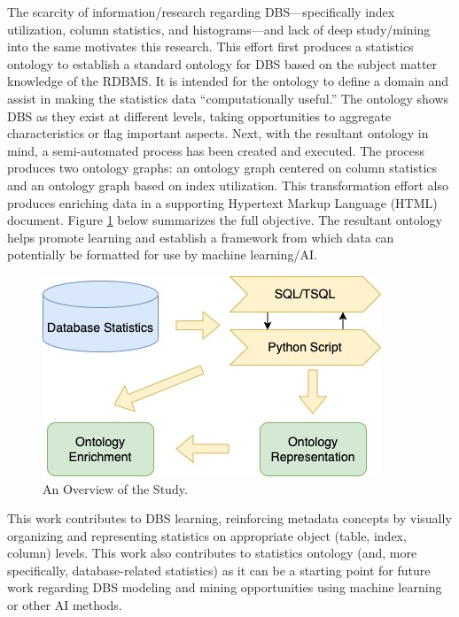 \documentclass[sigconf]{acmart}
\begin{document}
The scarcity of information/research regarding DBS—specifically index utilization, column statistics, and histograms—and lack of deep study/mining into the same motivates this research. This effort first produces a statistics ontology to establish a standard ontology for DBS based on the subject matter knowledge of the RDBMS. It is intended for the ontology to define a domain and assist in making the statistics data “computationally useful.” The ontology shows DBS as they exist at different levels, taking opportunities to aggregate characteristics or flag important aspects. Next, with the resultant ontology in mind, a semi-automated process has been created and executed. The process produces two ontology graphs: an ontology graph centered on column statistics and an ontology graph based on index utilization. This transformation effort also produces enriching data in a supporting Hypertext Markup Language (HTML) document. Figure \ref{overview} below summarizes the full objective. The resultant ontology helps promote learning and establish a framework from which data can potentially be formatted for use by machine learning/AI.

\begin{figure}[h]
	\centering
	\includegraphics[width=0.8\linewidth]{db-statistics-ontology}
	\caption{An Overview of the Study.}
	\label{overview}
\end{figure}

This work contributes to DBS learning, reinforcing metadata concepts by visually organizing and representing statistics on appropriate object (table, index, column) levels. This work also contributes to statistics ontology (and, more specifically, database-related statistics) as it can be a starting point for future work regarding DBS modeling and mining opportunities using machine learning or other AI methods.
\end{document}
